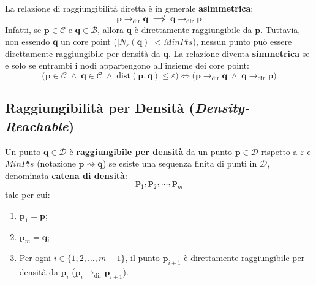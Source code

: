 \begin{property}
La relazione di raggiungibilità diretta è in generale \textbf{asimmetrica}:
\begin{equation}
    \mathbf{p} \to_{\mathrm{dir}} \mathbf{q} \;\not\implies\; \mathbf{q} \to_{\mathrm{dir}} \mathbf{p}
\end{equation}
Infatti, se $\mathbf{p} \in \mathcal{C}$ e $\mathbf{q} \in \mathcal{B}$, allora $\mathbf{q}$ è direttamente raggiungibile da $\mathbf{p}$. Tuttavia, non essendo $\mathbf{q}$ un core point ($|N_\varepsilon(\mathbf{q})| < MinPts$), nessun punto può essere direttamente raggiungibile per densità da $\mathbf{q}$. La relazione diventa \textbf{simmetrica} se e solo se entrambi i nodi appartengono all'insieme dei core point:
\begin{equation}
    \big(\mathbf{p} \in \mathcal{C} \;\land\; \mathbf{q} \in \mathcal{C} \;\land\; \mathrm{dist}(\mathbf{p}, \mathbf{q}) \le \varepsilon\big) \iff \big(\mathbf{p} \to_{\mathrm{dir}} \mathbf{q} \;\land\; \mathbf{q} \to_{\mathrm{dir}} \mathbf{p}\big)
\end{equation}
\end{property}

\FloatBarrier
\subsection{Raggiungibilità per Densità (\textit{Density-Reachable})}

\begin{definition}
Un punto $\mathbf{q} \in \mathcal{D}$ è \textbf{raggiungibile per densità} da un punto $\mathbf{p} \in \mathcal{D}$ rispetto a $\varepsilon$ e $MinPts$ (notazione $\mathbf{p} \rightsquigarrow \mathbf{q}$) se esiste una sequenza finita di punti in $\mathcal{D}$, denominata \textbf{catena di densità}:
\begin{equation}
    \mathbf{p}_1, \mathbf{p}_2, \dots, \mathbf{p}_m
\end{equation}
tale per cui:
\begin{enumerate}
    \item $\mathbf{p}_1 = \mathbf{p}$;
    \item $\mathbf{p}_m = \mathbf{q}$;
    \item Per ogni $i \in \{1, 2, \dots, m-1\}$, il punto $\mathbf{p}_{i+1}$ è direttamente raggiungibile per densità da $\mathbf{p}_i$ ($\mathbf{p}_i \to_{\mathrm{dir}} \mathbf{p}_{i+1}$).
\end{enumerate}
\end{definition}

